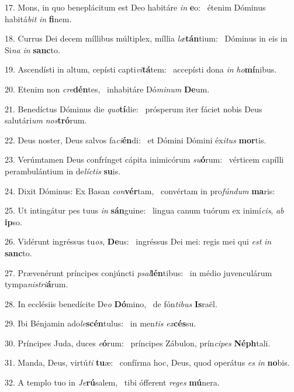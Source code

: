 17. Mons, in quo beneplácitum est Deo habitáre \textit{in} \textbf{e}o: \ast\  étenim Dóminus habitá\textit{bit} \textit{in} \textbf{fi}nem.\

18. Currus Dei decem míllibus múltiplex, míllia \textit{læ}\textbf{tán}tium: \ast\  Dóminus in eis in Si\textit{na} \textit{in} \textbf{sanc}to.\

19. Ascendísti in altum, cepísti capti\textit{vi}\textbf{tá}tem: \ast\  accepísti dona \textit{in} \textit{ho}\textbf{mí}nibus.\

20. Etenim non \textit{cre}\textbf{dén}tes, \ast\  inhabitáre Dó\textit{mi}\textit{num} \textbf{De}um.\

21. Benedíctus Dóminus die \textit{quo}\textbf{tí}die: \ast\  prósperum iter fáciet nobis Deus salutári\textit{um} \textit{nos}\textbf{tró}rum.\

22. Deus noster, Deus salvos fa\textit{ci}\textbf{én}di: \ast\  et Dómini Dómini éx\textit{i}\textit{tus} \textbf{mor}tis.\

23. Verúmtamen Deus confrínget cápita inimicórum \textit{su}\textbf{ó}rum: \ast\  vérticem capílli perambulántium in de\textit{líc}\textit{tis} \textbf{su}is.\

24. Dixit Dóminus: Ex Basan \textit{con}\textbf{vér}tam, \ast\  convértam in pro\textit{fún}\textit{dum} \textbf{ma}ris:\

25. Ut intingátur pes tuus \textit{in} \textbf{sán}guine: \ast\  lingua canum tuórum ex inimí\textit{cis}, \textit{ab} \textbf{ip}so.\

26. Vidérunt ingréssus tu\textit{os}, \textbf{De}us: \ast\  ingréssus Dei mei: regis mei qui \textit{est} \textit{in} \textbf{sanc}to.\

27. Prævenérunt príncipes conjúncti \textit{psal}\textbf{lén}tibus: \ast\  in médio juvenculárum tympa\textit{nis}\textit{tri}\textbf{á}rum.\

28. In ecclésiis benedícite De\textit{o} \textbf{Dó}mino, \ast\  de fón\textit{ti}\textit{bus} \textbf{Is}raël.\

29. Ibi Bénjamin ado\textit{le}\textbf{scén}tulus: \ast\  in men\textit{tis} \textit{ex}\textbf{cés}su.\

30. Príncipes Juda, duces \textit{e}\textbf{ó}rum: \ast\  príncipes Zábulon, prín\textit{ci}\textit{pes} \textbf{Néph}tali.\

31. Manda, Deus, virtú\textit{ti} \textbf{tu}æ: \ast\  confírma hoc, Deus, quod operátus \textit{es} \textit{in} \textbf{no}bis.\

32. A templo tuo in \textit{Je}\textbf{rú}salem, \ast\  tibi ófferent \textit{re}\textit{ges} \textbf{mú}nera.\

